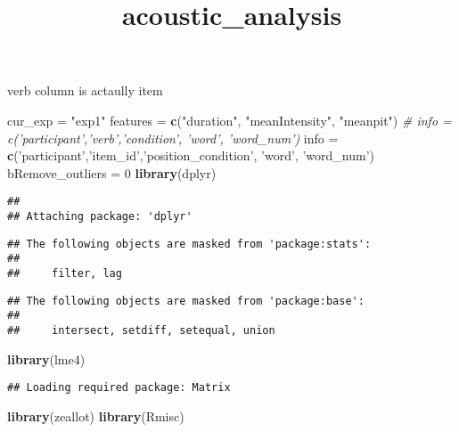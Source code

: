 \documentclass[]{article}
\title{acoustic\_analysis}
\author{}
\date{}
\newenvironment{Shaded}{\begin{snugshade}}{\end{snugshade}}
\newcommand{\CommentTok}[1]{\textcolor[rgb]{0.56,0.35,0.01}{\textit{#1}}}
\newcommand{\DecValTok}[1]{\textcolor[rgb]{0.00,0.00,0.81}{#1}}
\newcommand{\KeywordTok}[1]{\textcolor[rgb]{0.13,0.29,0.53}{\textbf{#1}}}
\newcommand{\NormalTok}[1]{#1}
\newcommand{\StringTok}[1]{\textcolor[rgb]{0.31,0.60,0.02}{#1}}
\begin{document}
\maketitle

verb column is actaully item

\begin{Shaded}
\begin{Highlighting}[]
\NormalTok{cur_exp =}\StringTok{ "exp1"}
\NormalTok{features =}\StringTok{ }\KeywordTok{c}\NormalTok{(}\StringTok{"duration"}\NormalTok{, }\StringTok{"meanIntensity"}\NormalTok{, }\StringTok{"meanpit"}\NormalTok{)}
\CommentTok{# info = c('participant','verb','condition', 'word', 'word_num')}
\NormalTok{info =}\StringTok{ }\KeywordTok{c}\NormalTok{(}\StringTok{'participant'}\NormalTok{,}\StringTok{'item_id'}\NormalTok{,}\StringTok{'position_condition'}\NormalTok{, }\StringTok{'word'}\NormalTok{, }\StringTok{'word_num'}\NormalTok{)}
\NormalTok{bRemove_outliers =}\StringTok{ }\DecValTok{0}
\KeywordTok{library}\NormalTok{(dplyr)}
\end{Highlighting}
\end{Shaded}

\begin{verbatim}
## 
## Attaching package: 'dplyr'
\end{verbatim}

\begin{verbatim}
## The following objects are masked from 'package:stats':
## 
##     filter, lag
\end{verbatim}

\begin{verbatim}
## The following objects are masked from 'package:base':
## 
##     intersect, setdiff, setequal, union
\end{verbatim}

\begin{Shaded}
\begin{Highlighting}[]
\KeywordTok{library}\NormalTok{(lme4)}
\end{Highlighting}
\end{Shaded}

\begin{verbatim}
## Loading required package: Matrix
\end{verbatim}

\begin{Shaded}
\begin{Highlighting}[]
\KeywordTok{library}\NormalTok{(zeallot)}
  \KeywordTok{library}\NormalTok{(Rmisc)}
\end{Highlighting}
\end{Shaded}
\end{document}
